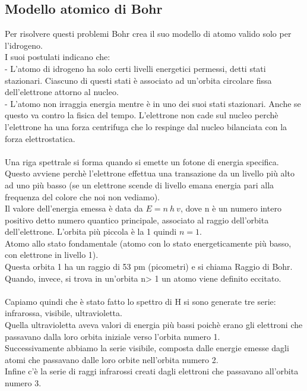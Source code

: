 \subsection{Modello atomico di Bohr}
Per risolvere questi problemi Bohr crea il suo modello di atomo valido solo per l'idrogeno.\\
I suoi postulati indicano che:\\
\tab- L'atomo di idrogeno ha solo certi livelli energetici permessi, detti stati stazionari. Ciascuno di questi stati è associato ad un'orbita circolare fissa dell'elettrone attorno al nucleo.\\
\tab- L'atomo non irraggia energia mentre è in uno dei suoi stati stazionari. Anche se questo va contro la fisica del tempo. L'elettrone non cade sul nucleo perchè l'elettrone ha una forza centrifuga che lo respinge dal nucleo bilanciata con la forza elettrostatica.\\\\
Una riga spettrale si forma quando si emette un fotone di energia specifica. Questo avviene perchè l'elettrone effettua una transazione da un livello più alto ad uno più basso (se un elettrone scende di livello emana energia pari alla frequenza del colore che noi non vediamo).\\
Il valore dell'energia emessa è data da $E = n\ h\ v$, dove n è un numero intero positivo detto numero quantico principale, associato al raggio dell'orbita dell'elettrone. L'orbita più piccola è la 1 quindi $n = 1$.\\
Atomo allo stato fondamentale (atomo con lo stato energeticamente più basso, con elettrone in livello 1).\\
Questa orbita 1 ha un raggio di 53 pm (picometri) e si chiama Raggio di Bohr.\\
Quando, invece, si trova in un'orbita n> 1 un atomo viene definito eccitato.\\\\
Capiamo quindi che è stato fatto lo spettro di H si sono generate tre serie:\\
infrarossa, visibile, ultravioletta.\\
Quella ultravioletta aveva valori di energia più bassi poichè erano gli elettroni che passavano dalla loro orbita iniziale verso l'orbita numero 1.\\
Successivamente abbiamo la serie visibile, composta dalle energie emesse dagli atomi che passavano dalle loro orbite nell'orbita numero 2.\\
Infine c'è la serie di raggi infrarossi creati dagli elettroni che passavano all'orbita numero 3.\\\\
